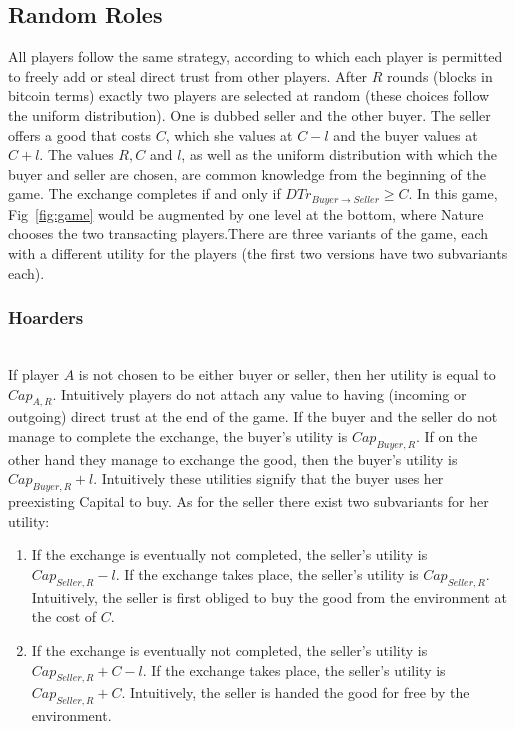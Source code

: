 \subsection{Random Roles}
  All players follow the same strategy, according to which each player is permitted to freely add or steal direct trust from
  other players. After $R$ rounds (blocks in bitcoin terms) exactly two players are selected at random (these choices follow
  the uniform distribution). One is dubbed seller and the other buyer. The seller offers a good that costs $C$, which she
  values at $C - l$ and the buyer values at $C + l$. The values $R, C$ and $l$, as well as the uniform distribution with which
  the buyer and seller are chosen, are common knowledge from the beginning of the game. The exchange completes if and only if
  $DTr_{Buyer \rightarrow Seller} \geq C$. In this game, Fig~\ref{fig:game} would be augmented by one level at the bottom,
  where Nature chooses the two transacting players.There are three variants of the game, each with a different utility for the
  players (the first two versions have two subvariants each).

  \subsubsection{Hoarders} \ \\

    If player $A$ is not chosen to be either buyer or seller, then her utility is equal to $Cap_{A, R}$. Intuitively players
    do not attach any value to having (incoming or outgoing) direct trust at the end of the game. If the buyer and the seller
    do not manage to complete the exchange, the buyer's utility is $Cap_{Buyer, R}$. If on the other hand they manage to
    exchange the good, then the buyer's utility is $Cap_{Buyer, R} + l$. Intuitively these utilities signify that the buyer
    uses her preexisting Capital to buy. As for the seller there exist two subvariants for her utility:
    \begin{enumerate}
      \item If the exchange is eventually not completed, the seller's utility is $Cap_{Seller, R} - l$. If the exchange takes
      place, the seller's utility is $Cap_{Seller, R}$. Intuitively, the seller is first obliged to buy the good from the
      environment at the cost of $C$.

      \item If the exchange is eventually not completed, the seller's utility is $Cap_{Seller, R} + C - l$. If the exchange
      takes place, the seller's utility is $Cap_{Seller, R} + C$. Intuitively, the seller is handed the good for free by the
      environment.
    \end{enumerate}
    
